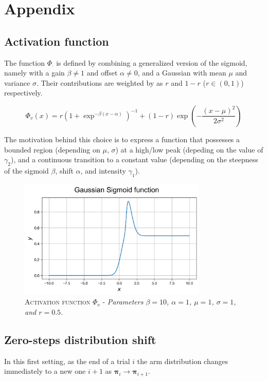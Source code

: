 
\section{Appendix}\label{sec:appendix}


\subsection{Activation function}
\noindent The function $\Phi_{\cdot}$ is defined by combining a generalized version of the sigmoid, namely with a gain $\beta \neq 1$ and offset $\alpha\neq 0$, and a Gaussian with mean $\mu$ and variance $\sigma$. Their contributions are weighted by as $r$ and $1-r$ ($r\in(0,1)$) respectively.

\begin{equation*}
    \Phi_v(x) = r\left(1 + \exp^{-\beta(x-\alpha)}\right)^{-1} + (1-r)\exp\left(-\frac{(x-\mu)^2}{2\sigma^2}\right)
\end{equation*}

\noindent The motivation behind this choice is to express a function that possesses a bounded region (depending on $\mu,\,\sigma$) at a high/low peak (depeding on the value of $\gamma_{2}$), and a continuous transition to a constant value (depending on the steepness of the sigmoid $\beta$, shift
$\alpha$, and intensity $\gamma_{1}$).

\begin{figure}[ht]
    \centering
    \includegraphics[width=0.8\textwidth]{figures/gaussian_sigmoid.png}
    \caption{\textsc{Activation function $\Phi_{v}$} - \textit{Parameters $\beta=10$, $\alpha=1$, $\mu=1$, $\sigma=1$, and $r=0.5$.}}
    \label{fig:gau_sigm}
\end{figure}

\subsection{Zero-steps distribution shift}
In this first setting, as the end of a trial $i$ the arm distribution changes immediately to a new one $i+1$ as $\mathbf{\pi}_{i} \to \mathbf{\pi}_{i+1}$.

